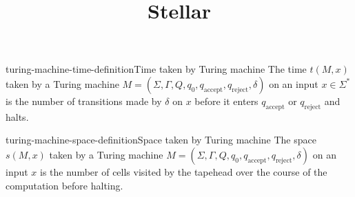 \documentclass[preview]{standalone}
\begin{document}
\title{Stellar}
\genpage

\begin{snippetdefinition}{turing-machine-time-definition}{Time taken by Turing machine}
    The time $t(M, x)$ taken by a Turing machine $M=\left(\Sigma, \Gamma, Q, q_0, q_{\text {accept}}, q_{\text {reject}}, \delta\right)$
    on an input $x \in \Sigma^*$ is the number of transitions made by $\delta$ on $x$ before it enters $q_{\text {accept}}$ or $q_{\text {reject}}$ and halts.
\end{snippetdefinition}

\begin{snippetdefinition}{turing-machine-space-definition}{Space taken by Turing machine}
    The space $s(M, x)$ taken by a Turing machine $M=\left(\Sigma, \Gamma, Q, q_0, q_{\text {accept}}, q_{\text {reject}}, \delta\right)$
    on an input $x$ is the number of cells visited by the tapehead over the course of the computation before halting.
\end{snippetdefinition}
\end{document}
